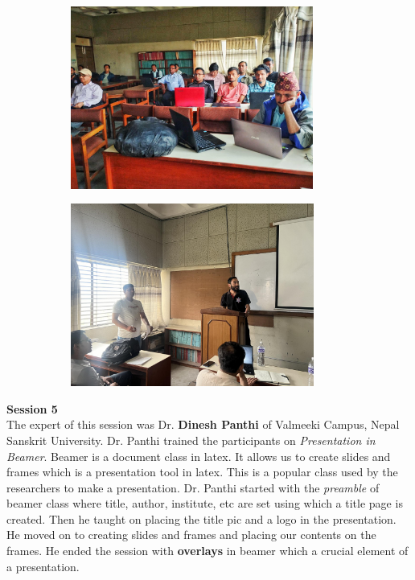 \documentclass[a4paper,12pt]{report}
\begin{document}
\begin{figure}[h!]
\centering
\begin{subfigure}{0.48\textwidth}
    \includegraphics[height=6cm, width=\textwidth]{santosh.jpg}
\end{subfigure}
\hfill
\begin{subfigure}{0.48\textwidth}
    \includegraphics[height=6cm, width=\textwidth]{sandesh2.jpg}
\end{subfigure}
\end{figure}

\vspace{7mm}
{\bfseries \large Session 5}\\[3mm]
The expert of this session was Dr. \textbf{Dinesh Panthi} of Valmeeki Campus, Nepal Sanskrit University. Dr. Panthi trained the participants on \textit{Presentation in Beamer}. Beamer is a document class in latex. It allows us to create slides and frames which is a presentation tool in latex. This is a popular class used by the researchers to make a presentation. Dr. Panthi started with the \textit{preamble} of beamer class where title, author, institute, etc are set using which a title page is created. Then he taught on placing the title pic and a logo in the presentation. He moved on to creating slides and frames and placing our contents on the frames. He ended the session with \textbf{overlays} in beamer which a crucial element of a presentation.
\clearpage
\end{document}
